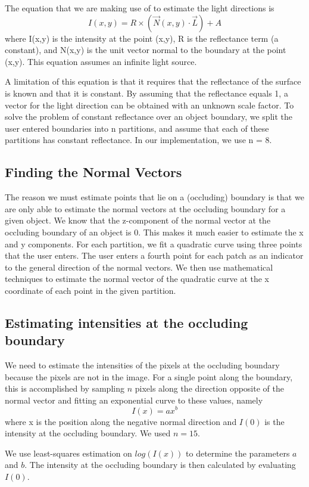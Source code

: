 \documentclass[10pt,twocolumn,letterpaper]{article}
\begin{document}
The equation that we are making use of to estimate the light directions is \[I(x,y) = R\times (\vec{N}(x,y)\cdot \vec{L}) + A\]
where I(x,y) is the intensity at the point (x,y), R is the reflectance term (a constant), and N(x,y) is the unit vector normal to the boundary at the point (x,y). This equation assumes an infinite light source.

A limitation of this equation is that it requires that the reflectance of the surface is known and that it is constant. By assuming that the reflectance equals 1, a vector for the light direction can be obtained with an unknown scale factor. To solve the problem of constant reflectance over an object boundary, we split the user entered boundaries into n partitions, and assume that each of these partitions has constant reflectance. In our implementation, we use n = 8.

\subsection{Finding the Normal Vectors}
The reason we must estimate points that lie on a (occluding) boundary is that we are only able to estimate the normal vectors at the occluding boundary for a given object. We know that the z-component of the normal vector at the occluding boundary of an object is 0. This makes it much easier to estimate the x and y components. For each partition, we fit a quadratic curve using three points that the user enters. The user enters a fourth point for each patch as an indicator to the general direction of the normal vectors. We then use mathematical techniques to estimate the normal vector of the quadratic curve at the x coordinate of each point in the given partition.

\subsection{Estimating intensities at the occluding boundary}
We need to estimate the intensities of the pixels at the occluding boundary because the pixels are not in the image. For a single point along the boundary, this is accomplished by sampling $n$ pixels along the direction opposite of the normal vector and fitting an exponential curve to these values, namely \[I(x) = ax^{b}\] where x is the position along the negative normal direction and $I(0)$ is the intensity at the occluding boundary. We used $n = 15$.

We use least-squares estimation on $log(I(x))$ to determine the parameters $a$ and $b$. The intensity at the occluding boundary is then calculated by evaluating $I(0)$.
\end{document}
